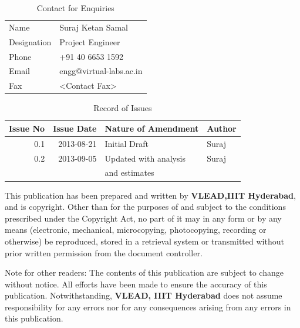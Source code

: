 \documentclass[11pt]{article}
\begin{document}
\begin{table}[H]
\caption{\label{tbl: Contact for Enquiries}Contact for Enquiries}
\begin{center}
\begin{tabular}{ll}
\hline
 Name         &  Suraj Ketan Samal        \\
 Designation  &  Project Engineer         \\
 Phone        &  +91 40 6653 1592         \\
 Email        &  engg@virtual-labs.ac.in  \\
 Fax          &  <Contact Fax>            \\
\hline
\end{tabular}
\end{center}
\end{table}




\begin{table}[H]
\caption{\label{tbl: Record of Issues}Record of Issues}
\begin{center}
\begin{tabular}{rrll}
\hline
 Issue No  &  Issue Date  &  Nature of Amendment    &  Author  \\
\hline
      0.1  &  2013-08-21  &  Initial Draft          &  Suraj   \\
      0.2  &  2013-09-05  &  Updated with analysis  &  Suraj   \\
           &              &  and estimates          &          \\
\hline
\end{tabular}
\end{center}
\end{table}


This publication has been prepared and written by \textbf{VLEAD,IIIT Hyderabad}, and is copyright. Other than for the purposes of and
subject to the conditions prescribed under the Copyright Act, no part
of it may in any form or by any means (electronic, mechanical,
microcopying, photocopying, recording or otherwise) be reproduced,
stored in a retrieval system or transmitted without prior written
permission from the document controller.

Note for other readers: The contents of this publication are subject
to change without notice. All efforts have been made to ensure the
accuracy of this publication. Notwithstanding, \textbf{VLEAD, IIIT Hyderabad}
does not assume responsibility for any errors nor for any consequences
arising from any errors in this publication.
\end{document}
